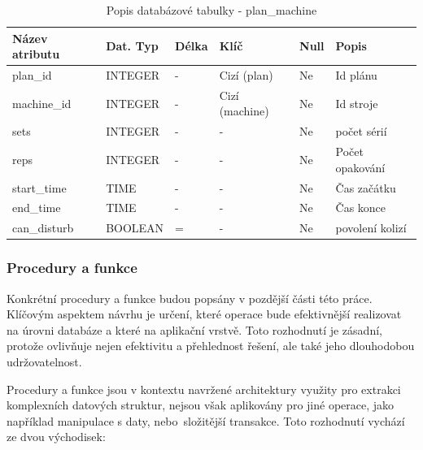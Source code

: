 \begin{table}[h!]
	\caption{Popis databázové tabulky - plan\_machine}
    \label{tab:dat-dictionary-plan-machine}
	\begin{tabular}{|p{3.5cm}|p{2cm}|p{1cm}|p{2.5cm}|p{.75cm}|p{3.75cm}|}
		\hline
        \textbf{Název atributu} & \textbf{Dat. Typ} & \textbf{Délka} & \textbf{Klíč} & \textbf{Null} & \textbf{Popis} \\
        \hline
            plan\_id        & INTEGER   &  -    & Cizí (plan)       & Ne & Id plánu \\
        \hline
            machine\_id     & INTEGER   &  -    & Cizí (machine)       & Ne & Id stroje \\
        \hline
            sets                & INTEGER   &  -   & -                 & Ne & počet sérií\\
        \hline
            reps                & INTEGER   &  -    & -                 & Ne &  Počet opakování \\
        \hline
            start\_time     & TIME      &  -    & -                 & Ne & Čas začátku \\
        \hline
            end\_time       & TIME      &  -    & -                 & Ne & Čas konce \\
        \hline
            can\_disturb          & BOOLEAN   &  =    & -                 & Ne & povolení kolizí \\
        \hline
	\end{tabular}
\end{table}

\subsubsection{Procedury a funkce}
Konkrétní procedury a funkce budou popsány v pozdější části této práce. Klíčovým aspektem návrhu je určení, které operace bude efektivnější realizovat na úrovni databáze a které na aplikační vrstvě. Toto rozhodnutí je zásadní, protože ovlivňuje nejen efektivitu a přehlednost řešení, ale také jeho dlouhodobou udržovatelnost.

Procedury a funkce jsou v kontextu navržené architektury využity pro extrakci komplexních datových struktur, nejsou však aplikovány pro jiné operace, jako například manipulace s daty, nebo~složitější transakce. Toto rozhodnutí vychází ze dvou východisek:

